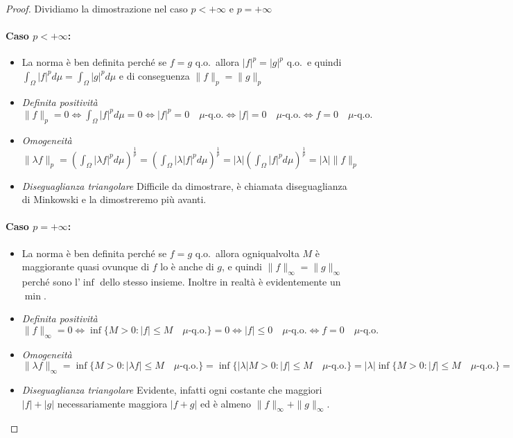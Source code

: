\begin{proof}
    Dividiamo la dimostrazione nel caso \(p < +\infty\) e \(p = +\infty\) 

    \paragraph{Caso \(p < +\infty\):}
\begin{itemize}[label = --]
    \item La norma è ben definita perché se \(f = g\) q.o.~allora \(|f|^{p} =
        |g|^{p}\) q.o.~e quindi \(\int_{\Omega} |f|^{p} d\mu = \int_{\Omega}
        |g|^{p} d\mu\) e di conseguenza \(\|f\|_p = \|g\|_p\) 
    \item \emph{Definita positività} \(\|f\|_p = 0 \iff \int_{\Omega} |f|^{p}
        d\mu = 0 \iff |f|^{p} = 0 \quad \mu\text{-q.o.} \iff |f| = 0 \quad
        \mu\text{-q.o.} \iff f = 0 \quad \mu\text{-q.o.}\)
    \item \emph{Omogeneità} \(\|\lambda f\|_p = {\left( \int_{\Omega} |\lambda
        f|^{p} d\mu \right)}^{\frac{1}{p}} = {\left( \int_{\Omega} |\lambda
        |f|^{p} d\mu \right)}^{\frac{1}{p}} = |\lambda| {\left( \int_{\Omega}
        |f|^{p} d\mu \right)}^{\frac{1}{p}} = |\lambda| \|f\|_p\)
    \item \emph{Diseguaglianza triangolare} Difficile da dimostrare, è chiamata
        diseguaglianza di Minkowski e la dimostreremo più avanti.
\end{itemize}
\paragraph{Caso \(p = +\infty\):}
\begin{itemize}[label = --]
    \item La norma è ben definita perché se \(f = g\) q.o.~allora ogniqualvolta
        \(M\) è maggiorante quasi ovunque di \(f\) lo è anche di \(g\), e quindi
        \(\|f\|_{\infty} = \|g\|_{\infty}\) perché sono l'\(\inf\)  dello stesso
        insieme. Inoltre in realtà è evidentemente un \(\min\).
    \item \emph{Definita positività} \(\|f\|_{\infty} = 0 \iff \inf \{M > 0 : |f|
        \le M \quad \mu\text{-q.o.} \} = 0 \iff |f| \le 0 \quad \mu\text{-q.o.}
        \iff f = 0 \quad \mu\text{-q.o.}\)
    \item \emph{Omogeneità} \(\|\lambda f\|_{\infty} = \inf \{M > 0 : |\lambda f| \le M
        \quad \mu\text{-q.o.} \} = \inf \{|\lambda| M > 0 : |f| \le M \quad
        \mu\text{-q.o.} \} = |\lambda| \inf \{M > 0 : |f| \le M \quad
        \mu\text{-q.o.} \} = |\lambda| \|f\|_{\infty}\)
    \item \emph{Diseguaglianza triangolare} Evidente, infatti ogni costante che
        maggiori \(|f| + |g|\) necessariamente maggiora \(|f + g|\) ed è almeno
        \(\|f\|_\infty + \|g\|_\infty\).
\end{itemize}
\end{proof}

